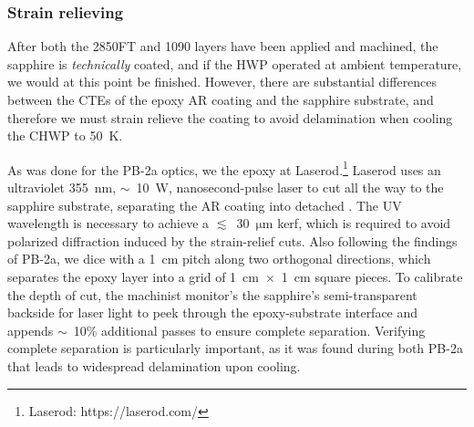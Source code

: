 
\subsubsection{Strain relieving}
\label{sec:sapphire_ar_coating_epoxy_fabrication_strain_relief}

After both the 2850FT and 1090 layers have been applied and machined, the sapphire is \textit{technically} coated, and if the HWP operated at ambient temperature, we would at this point be finished. However, there are substantial differences between the CTEs of the epoxy AR coating and the sapphire substrate, and therefore we must strain relieve the coating to avoid delamination when cooling the CHWP to 50~K. 

As was done for the PB-2a optics, we  the epoxy at Laserod.\footnote{Laserod: https://laserod.com/} Laserod uses an ultraviolet 355~nm, $\sim$~10~W, nanosecond-pulse laser to cut all the way to the sapphire substrate, separating the AR coating into detached . The UV wavelength is necessary to achieve a $\lesssim$~30~$\mathrm{\mu m}$ kerf, which is required to avoid polarized diffraction induced by the strain-relief cuts. Also following the findings of PB-2a, we dice with a 1~cm pitch along two orthogonal directions, which separates the epoxy layer into a grid of 1~cm~$\times$~1~cm square pieces. To calibrate the depth of cut, the machinist monitor's the sapphire's semi-transparent backside for laser light to peek through the epoxy-substrate interface and appends $\sim$~10\% additional passes to ensure complete separation. Verifying complete separation is particularly important, as it was found during both PB-2a that  leads to widespread delamination upon cooling.

